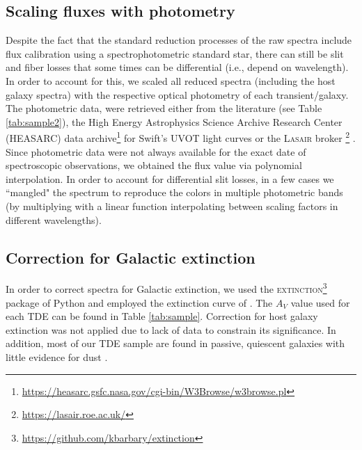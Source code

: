 \documentclass[structabstract]{aa}
\begin{document}
\subsection{Scaling fluxes with photometry} \label{subsub:sfwp}
Despite the fact that the standard reduction processes of the raw spectra include flux calibration using a spectrophotometric standard star, there can still be slit and fiber losses that some times can be differential (i.e., depend on wavelength). %
In order to account for this, we scaled all reduced spectra (including the host galaxy spectra) with the respective optical photometry of each transient/galaxy. The photometric data,
were retrieved either from the literature (see Table \ref{tab:sample2}), the High Energy Astrophysics Science Archive Research Center (\textsc{HEASARC}) data archive\footnote{\url{https://heasarc.gsfc.nasa.gov/cgi-bin/W3Browse/w3browse.pl}} for Swift's \textsc{UVOT} light curves or the \textsc{Lasair} broker \footnote{\url{https://lasair.roe.ac.uk/}} \citep{Smith2019}. 
Since photometric data were not always available for the exact date of spectroscopic observations, we obtained the flux value via polynomial interpolation. 
In order to account for differential slit losses, in a few cases we ``mangled" the spectrum to reproduce the colors in multiple photometric bands (by multiplying with a linear function interpolating between scaling factors in different wavelengths). 


\subsection{Correction for Galactic extinction} \label{subsub:cfge}
In order to correct spectra for Galactic extinction, we used the \textsc{extinction}\footnote{\url{https://github.com/kbarbary/extinction}} package of Python and employed the extinction curve of \citet{Cardelli1989}. The $A_{V}$ value used for each TDE can be found in Table \ref{tab:sample}. Correction for host galaxy extinction was not applied due to lack of data to constrain its significance. In addition, most of our TDE sample are found in passive, quiescent galaxies with little evidence for dust \citep{Arcavi2014,French2020}. 
\end{document}
